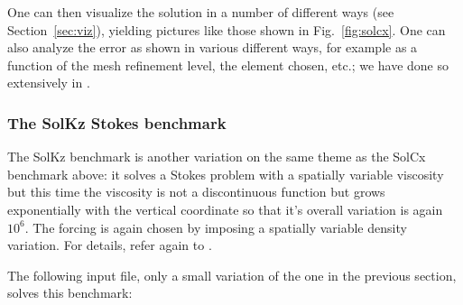 \documentclass{article}
\begin{document}
One can then visualize the solution in a number of different ways (see
Section~\ref{sec:viz}), yielding pictures like those shown in
Fig.~\ref{fig:solcx}. One can also analyze the error as shown in various
different ways, for example as a function of the mesh refinement level, the
element chosen, etc.; we have done so extensively in \cite{KHB12}.


\subsubsection{The SolKz Stokes benchmark}
\label{sec:benchmark-solkz}

The SolKz benchmark is another variation on the same theme as the SolCx
benchmark above: it solves a Stokes problem with a spatially variable
viscosity but this time the viscosity is not a discontinuous function but
grows exponentially with the vertical coordinate so that it's overall
variation is again $10^6$. The forcing is again chosen by imposing a spatially
variable density variation. For details, refer again to \cite{DMGT11}.

The following input file, only a small variation of the one in the previous
section, solves this benchmark:
\end{document}
